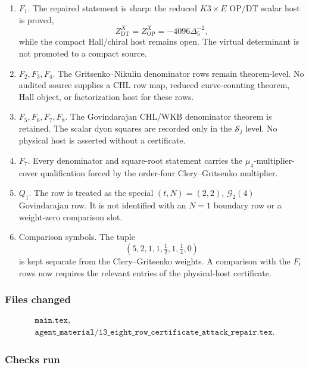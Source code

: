 \begin{enumerate}
\item \(F_1\).  The repaired statement is sharp: the reduced
\(K3\times E\) OP/DT scalar host is proved,
\[
Z^X_{\mathrm{DT}}=Z^X_{\mathrm{OP}}=-4096\Delta_5^{-2},
\]
while the compact Hall/chiral host remains open.  The virtual determinant
is not promoted to a compact source.
\item \(F_2,F_3,F_4\).  The Gritsenko--Nikulin denominator rows remain
theorem-level.  No audited source supplies a CHL row map, reduced
curve-counting theorem, Hall object, or factorization host for these rows.
\item \(F_5,F_6,F_7,F_8\).  The Govindarajan CHL/WKB denominator
theorem is retained.  The scalar dyon squares are recorded only in the
\(\mathscr S_j\) level.  No physical host is asserted without a
certificate.
\item \(F_7\).  Every denominator and square-root statement carries the
\(\mu_4\)-multiplier-cover qualification forced by the order-four
Clery--Gritsenko multiplier.
\item \(Q_1\).  The row is treated as the special
\((t,N)=(2,2)\), \(\mathcal G_2(4)\) Govindarajan row.  It is not
identified with an \(N=1\) boundary row or a weight-zero comparison slot.
\item Comparison symbols.  The tuple
\[
(5,2,1,1,\tfrac12,1,\tfrac14,0)
\]
is kept separate from the Clery--Gritsenko weights.  A comparison with
the \(F_i\) rows now requires the relevant entries of the physical-host
certificate.
\end{enumerate}

\subsubsection*{Files changed}

\[
\begin{array}{l}
\texttt{main.tex},\\
\texttt{agent\_material/13\_eight\_row\_certificate\_attack\_repair.tex}.
\end{array}
\]

\subsubsection*{Checks run}

